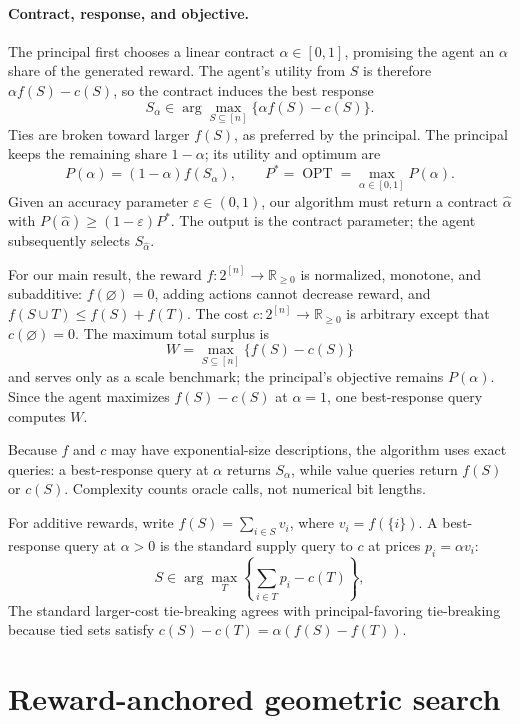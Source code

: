 \documentclass[11pt]{article}
\newcommand{\OPT}{\operatorname{OPT}}
\newcommand{\eps}{\varepsilon}
\begin{document}
\paragraph{Contract, response, and objective.}
The principal first chooses a linear contract $\alpha\in[0,1]$, promising the
agent an $\alpha$ share of the generated reward.  The agent's utility from
$S$ is therefore $\alpha f(S)-c(S)$, so the contract induces the best response
\[
 S_\alpha\in\arg\max_{S\subseteq[n]}
        \{\alpha f(S)-c(S)\}.
\]
Ties are broken toward larger $f(S)$, as preferred by the principal.  The
principal keeps the remaining share $1-\alpha$; its utility and optimum are
\[
 P(\alpha)=(1-\alpha)f(S_\alpha),\qquad
          P^*=\OPT=\max_{\alpha\in[0,1]}P(\alpha).
\]
Given an accuracy parameter $\eps\in(0,1)$, our algorithm must return a
contract $\widehat\alpha$ with
$P(\widehat\alpha)\geq(1-\eps)P^*$.  The output is the contract parameter;
the agent subsequently selects $S_{\widehat\alpha}$.

For our main result, the reward $f:2^{[n]}\to\mathbb{R}_{\geq0}$ is normalized, monotone, and
subadditive: $f(\varnothing)=0$, adding actions cannot decrease reward, and
$f(S\cup T)\leq f(S)+f(T)$.  The cost
$c:2^{[n]}\to\mathbb{R}_{\geq0}$ is arbitrary except that
$c(\varnothing)=0$.  The maximum total surplus is
\[
              W=\max_{S\subseteq[n]}\{f(S)-c(S)\}
\]
and serves only as a scale benchmark; the principal's objective remains
$P(\alpha)$.  Since the agent maximizes $f(S)-c(S)$ at $\alpha=1$, one
best-response query computes $W$.

Because $f$ and $c$ may have exponential-size descriptions, the algorithm
uses exact queries: a best-response query at $\alpha$ returns $S_\alpha$,
while value queries return $f(S)$ or $c(S)$.  Complexity counts oracle calls,
not numerical bit lengths.

For additive rewards, write $f(S)=\sum_{i\in S}v_i$, where $v_i=f(\{i\})$.
A best-response query at $\alpha>0$ is the standard supply query to $c$ at
prices $p_i=\alpha v_i$:
\[
       S\in\arg\max_T\left\{\sum_{i\in T}p_i-c(T)\right\},
\]
The standard larger-cost tie-breaking agrees with principal-favoring
tie-breaking because tied sets satisfy
$c(S)-c(T)=\alpha(f(S)-f(T))$.

\section{Reward-anchored geometric search}\label{sec:algorithm}
\end{document}
